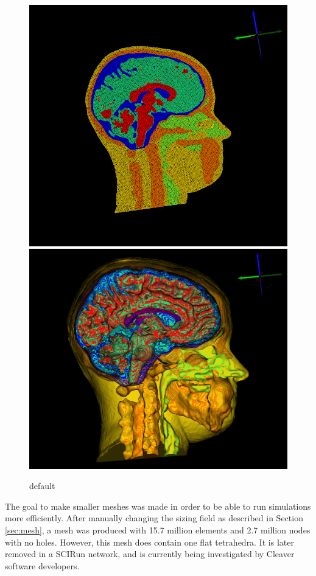 \begin{figure}[H]
\begin{center}
\includegraphics[width=.49\textwidth]{Figures/bigmesh_1}
\includegraphics[width=.49\textwidth]{Figures/bigmesh_surface}
\caption{default}
\label{default}
\end{center}
\end{figure}

The goal to make smaller meshes was made in order to be able to run simulations more efficiently. After manually changing the sizing field as described in Section \ref{sec:mesh}, a mesh was produced with 15.7 million elements and 2.7 million nodes with no holes. However, this mesh does contain one flat tetrahedra. It is later removed in a SCIRun network, and is currently being investigated by Cleaver software developers.

